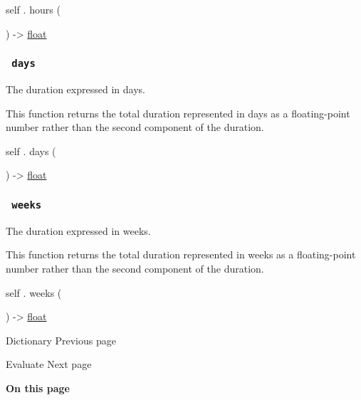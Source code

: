 self { . } { hours } (

) -\textgreater{} \href{/docs/reference/foundations/float/}{float}

\subsubsection{\texorpdfstring{\texttt{\ days\ }}{ days }}\label{definitions-days}

The duration expressed in days.

This function returns the total duration represented in days as a
floating-point number rather than the second component of the duration.

self { . } { days } (

) -\textgreater{} \href{/docs/reference/foundations/float/}{float}

\subsubsection{\texorpdfstring{\texttt{\ weeks\ }}{ weeks }}\label{definitions-weeks}

The duration expressed in weeks.

This function returns the total duration represented in weeks as a
floating-point number rather than the second component of the duration.

self { . } { weeks } (

) -\textgreater{} \href{/docs/reference/foundations/float/}{float}

\href{/docs/reference/foundations/dictionary/}{\pandocbounded{}}

{ Dictionary } { Previous page }

\href{/docs/reference/foundations/eval/}{\pandocbounded{}}

{ Evaluate } { Next page }

\textbf{On this page}

